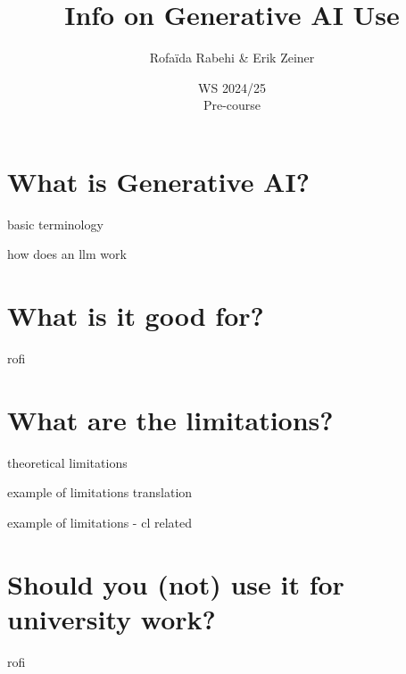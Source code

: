 \documentclass[aspectratio=169,hyperref={unicode}]{beamer}
\title{Info on Generative AI Use}
\author{Rofaïda Rabehi \& Erik Zeiner}
\institute{Fachschaft General \& Computational Linguistics\\ \textbf{University of Tübingen}}
\date{WS 2024/25 \\ Pre-course}
\begin{document}
\frame{\titlepage}



\section{What is Generative AI?}

\begin{frame}
	basic terminology
\end{frame}

\begin{frame}
	how does an llm work
\end{frame}

\section{What is it good for?}

\begin{frame}
	rofi
\end{frame}

\section{What are the limitations?}

\begin{frame}
	theoretical limitations
\end{frame}

\begin{frame}
	example of limitations translation
\end{frame}

\begin{frame}
	example of limitations - cl related
\end{frame}

\section{Should you (not) use it for university work?}

\begin{frame}
	rofi
\end{frame}
\end{document}
